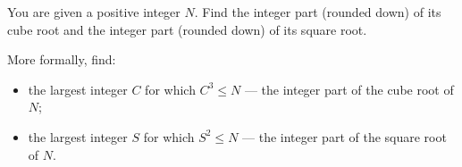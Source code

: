 You are given a positive integer $N$. Find the integer part (rounded down) of its cube root and the integer part (rounded down) of its square root.

More formally, find:

\begin{itemize}
\item the largest integer $C$ for which $C^3 \le N$ --- the integer part of the cube root of $N$;
\item the largest integer $S$ for which $S^2 \le N$ --- the integer part of the square root of $N$.
\end{itemize}
